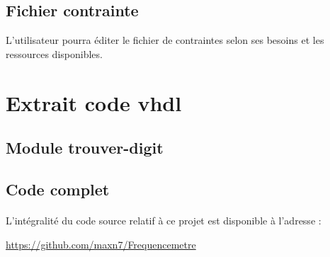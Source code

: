 \documentclass[a4paper,11pt]{article}
\begin{document}
\subsection{Fichier contrainte}
L'utilisateur pourra éditer le fichier de contraintes selon ses besoins et les ressources disponibles.

\newpage
\section{Extrait code vhdl}
\subsection{Module trouver-digit}


\subsection{Code complet}

\paragraph{} L'intégralité du code source relatif à ce projet est disponible à l'adresse :
 \begin{center} 
  \url{https://github.com/maxn7/Frequencemetre}
 \end{center}
\end{document}
